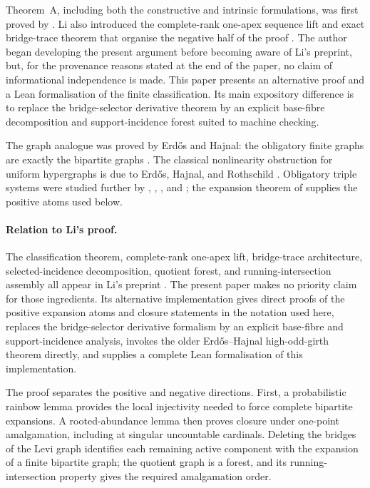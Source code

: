 \documentclass[a4paper,11pt,reqno]{amsart}
\theoremstyle{plain}
\theoremstyle{definition}
\theoremstyle{remark}
\begin{document}
Theorem~A, including both the constructive and intrinsic formulations, was
first proved by \citet[Theorem~1.1]{li2026}.  Li also introduced the
complete-rank one-apex sequence lift and exact bridge-trace theorem that
organise the negative half of the proof
\citep[Sections~3--4 and Theorem~4.6]{li2026}.  The author began developing
the present argument before becoming aware of Li's preprint, but, for the
provenance reasons stated at the end of the paper, no claim of informational
independence is made.  This paper presents an alternative proof and a Lean
formalisation of the finite classification.  Its main expository difference
is to replace the bridge-selector derivative theorem by an explicit
base-fibre decomposition and support-incidence forest suited to machine
checking.

The graph analogue was proved by Erdős and Hajnal: the obligatory finite
graphs are exactly the bipartite graphs
\citep[Corollary~5.6 and Theorem~7.4]{erdoshajnal1966}.  The classical
nonlinearity obstruction for uniform hypergraphs is due to Erdős, Hajnal,
and Rothschild \citep[Theorem~2, p.~532]{ehr1973}.  Obligatory triple
systems were studied further by \citet{egh1975}, \citet{komjath2001},
\citet{hajnalkomjath2008}, and \citet{komjath2008}; the expansion theorem of
\citet[Theorem~1.2]{reiher2024} supplies the positive atoms used below.

\paragraph{Relation to Li's proof.}
The classification theorem, complete-rank one-apex lift, bridge-trace
architecture, selected-incidence decomposition, quotient forest, and
running-intersection assembly all appear in Li's preprint
\citep[Sections~3--5]{li2026}.  The present paper makes no priority claim for
those ingredients.  Its alternative implementation gives direct proofs of
the positive expansion atoms and closure statements in the notation used
here, replaces the bridge-selector derivative formalism by an explicit
base-fibre and support-incidence analysis, invokes the older Erdős--Hajnal
high-odd-girth theorem directly, and supplies a complete Lean formalisation of
this implementation.

The proof separates the positive and negative directions.  First, a
probabilistic rainbow lemma provides the local injectivity needed to force
complete bipartite expansions.  A rooted-abundance lemma then proves closure
under one-point amalgamation, including at singular uncountable cardinals.
Deleting the bridges of the Levi graph identifies each remaining active
component with the expansion of a finite bipartite graph; the quotient graph
is a forest, and its running-intersection property gives the required
amalgamation order.
\end{document}

